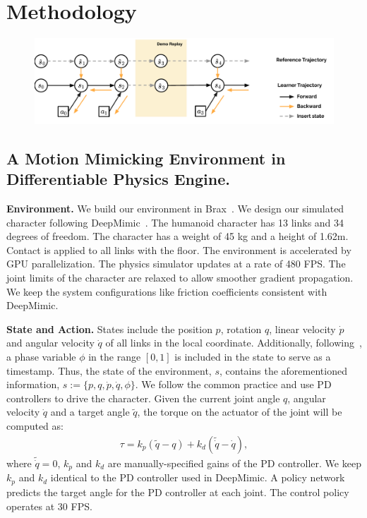 \section{Methodology}
\begin{figure}[t]
    \centering
    \includegraphics[width=.9\textwidth]{figures/Demo_Replay.pdf}
    \label{fig:computation_graph}
\end{figure}


\subsection{A Motion Mimicking Environment in Differentiable Physics Engine.} 
\textbf{Environment.} We build our environment in Brax~\citep{freeman2021brax}. We design our simulated character following DeepMimic~\citep{peng2018deepmimic}. The humanoid character has 13 links and 34 degrees of freedom.  The character has a weight of 45 kg and a height of 1.62m. Contact is applied to all links with the floor. The environment is accelerated by GPU parallelization. The physics simulator updates at a rate of 480 FPS. The joint limits of the character are relaxed to allow smoother gradient propagation. {We keep the system configurations like friction coefficients consistent with DeepMimic.}

\textbf{State and Action.} States include the position $p$, rotation $q$, linear velocity $\dot{p}$ and angular velocity $\dot{q}$ of all links in the local coordinate. Additionally, following~\citet{peng2018deepmimic}, a phase variable $\phi$ in the range $[0, 1]$ is included in the state to serve as a timestamp. Thus, the state of the environment, $s$, contains the aforementioned information, $s := \{p, q, \dot{p}, \dot{q}, \phi \}$. We follow the common practice and use PD controllers to drive the character. Given the current joint angle $q$, angular velocity $\dot{q}$ and a target angle $\tilde{q}$, the torque on the actuator of the joint will be computed as:
\begin{align}
    \tau = k_p (\tilde{q} - q) + k_d (\tilde{\dot{q}}-\dot{q}),
\end{align}
where $\tilde{\dot{q}}=0$, $k_p$ and $k_d$ are manually-specified gains of the PD controller. We keep $k_p$ and $k_d$ identical to the PD controller used in DeepMimic. A policy network predicts the target angle for the PD controller at each joint. The control policy operates at 30 FPS. 


